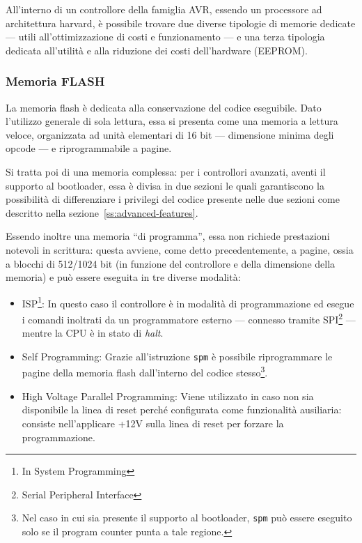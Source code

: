 All'interno di un controllore della famiglia AVR, essendo un processore ad architettura harvard, è possibile trovare due diverse tipologie di memorie dedicate --- utili all'ottimizzazione di costi e funzionamento --- e una terza tipologia dedicata all'utilità e alla riduzione dei costi dell'hardware (EEPROM).

\subsubsection{Memoria FLASH}
La memoria flash è dedicata alla conservazione del codice eseguibile.
Dato l'utilizzo generale di sola lettura, essa si presenta come una memoria a lettura veloce, organizzata ad unità elementari di 16 bit --- dimensione minima degli opcode\cite{avr:isa} --- e riprogrammabile a pagine.

Si tratta poi di una memoria complessa: per i controllori avanzati, aventi il supporto al bootloader, essa è divisa in due sezioni le quali garantiscono la possibilità di differenziare i privilegi del codice presente nelle due sezioni come descritto nella sezione~\ref{ss:advanced-features}.

Essendo inoltre una memoria ``di programma'', essa non richiede prestazioni notevoli in scrittura: questa avviene, come detto precedentemente, a pagine, ossia a blocchi di 512/1024 bit (in funzione del controllore e della dimensione della memoria) e può essere eseguita in tre diverse modalità:

\begin{itemize}
    \item ISP\footnote{In System Programming}: In questo caso il controllore è in modalità di programmazione ed esegue i comandi inoltrati da un programmatore esterno --- connesso tramite SPI\footnote{Serial Peripheral Interface} --- mentre la CPU è in stato di \textit{halt}.
    \item Self Programming: Grazie all'istruzione \texttt{spm} è possibile riprogrammare le pagine della memoria flash dall'interno del codice stesso\footnote{Nel caso in cui sia presente il supporto al bootloader, \texttt{spm} può essere eseguito solo se il program counter punta a tale regione.}.
    \item High Voltage Parallel Programming: Viene utilizzato in caso non sia disponibile la linea di reset perché configurata come funzionalità ausiliaria: consiste nell'applicare +12V sulla linea di reset per forzare la programmazione\cite[sec 28.6]{avr:m328p}.
\end{itemize}


